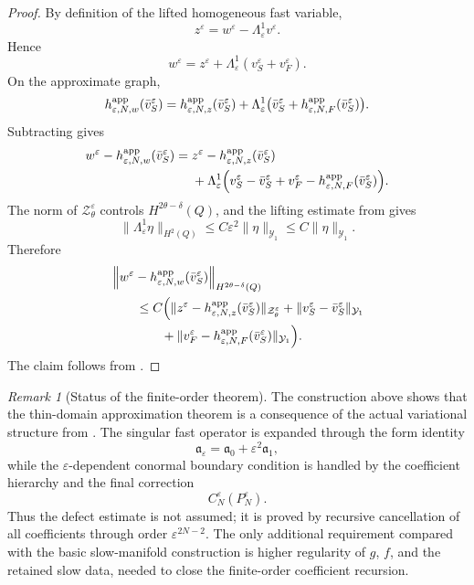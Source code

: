 \documentclass[11pt]{article}
\theoremstyle{definition}
\theoremstyle{remark}
\newtheorem{remark}[theorem]{Remark}
\numberwithin{equation}{section}
\begin{document}
\begin{proof}
By definition of the lifted homogeneous fast variable,
\[
z^\varepsilon
=
w^\varepsilon-\Lambda_\varepsilon^1v^\varepsilon.
\]
Hence
\[
w^\varepsilon
=
z^\varepsilon+\Lambda_\varepsilon^1(v_S^\varepsilon+v_F^\varepsilon).
\]
On the approximate graph,
\[
h_{\varepsilon,N,w}^{\rm app}(\bar v_S^\varepsilon)
=
h_{\varepsilon,N,z}^{\rm app}(\bar v_S^\varepsilon)
+
\Lambda_\varepsilon^1
\bigl(
\bar v_S^\varepsilon
+
h_{\varepsilon,N,F}^{\rm app}(\bar v_S^\varepsilon)
\bigr).
\]
Subtracting gives
\[
\begin{aligned}
w^\varepsilon
-
h_{\varepsilon,N,w}^{\rm app}(\bar v_S^\varepsilon)
={}&
z^\varepsilon
-
h_{\varepsilon,N,z}^{\rm app}(\bar v_S^\varepsilon)
\\
&+
\Lambda_\varepsilon^1
\Big(
v_S^\varepsilon-\bar v_S^\varepsilon
+
v_F^\varepsilon
-
h_{\varepsilon,N,F}^{\rm app}(\bar v_S^\varepsilon)
\Big).
\end{aligned}
\]
The norm of \(\mathcal Z_\theta^\varepsilon\) controls
\(H^{2\theta-\delta}(Q)\), and the lifting estimate from
 gives
\[
\|\Lambda_\varepsilon^1\eta\|_{H^2(Q)}
\le
C\varepsilon^2\|\eta\|_{\mathcal Y_1}
\le
C\|\eta\|_{\mathcal Y_1}.
\]
Therefore
\[
\begin{aligned}
&
\left\|
w^\varepsilon
-
h_{\varepsilon,N,w}^{\rm app}(\bar v_S^\varepsilon)
\right\|_{H^{2\theta-\delta}(Q)}
\\
&\qquad\le
C
\Big(
\|z^\varepsilon
-
h_{\varepsilon,N,z}^{\rm app}(\bar v_S^\varepsilon)\|_{\mathcal Z_\theta^\varepsilon}
+
\|v_S^\varepsilon-\bar v_S^\varepsilon\|_{\mathcal Y_1}
\\
&\qquad\qquad
+
\|v_F^\varepsilon
-
h_{\varepsilon,N,F}^{\rm app}(\bar v_S^\varepsilon)\|_{\mathcal Y_1}
\Big).
\end{aligned}
\]
The claim follows from .
\end{proof}

\begin{remark}[Status of the finite-order theorem]
The construction above shows that the thin-domain approximation theorem is a
consequence of the actual variational structure from
. The singular fast operator is expanded
through the form identity
\[
\mathfrak a_\varepsilon
=
\mathfrak a_0+\varepsilon^2\mathfrak a_1,
\]
while the \(\varepsilon\)-dependent conormal boundary condition is handled by
the coefficient hierarchy and the final correction
\[
C_N^\varepsilon(P_N^\varepsilon).
\]
Thus the defect estimate is not assumed; it is proved by recursive
cancellation of all coefficients through order \(\varepsilon^{2N-2}\). The
only additional requirement compared with the basic slow-manifold construction
is higher regularity of \(g\), \(f\), and the retained slow data, needed to
close the finite-order coefficient recursion.
\end{remark}
\end{document}
